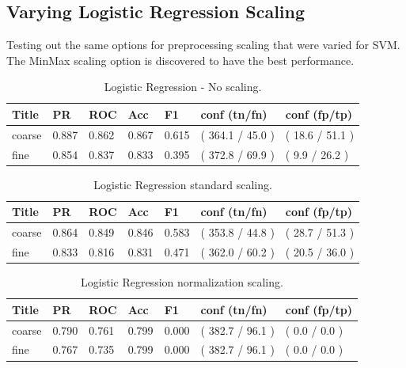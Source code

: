 \documentclass[ms]{nuthesis}
\begin{document}
\subsection{Varying Logistic Regression Scaling}
\label{sect:logitParam}
\par Testing out the same options for preprocessing scaling that were varied for SVM.
The MinMax scaling option is discovered to have the best performance.

\FloatBarrier
\begin{table}[H]
\centering
\caption{Logistic Regression - No scaling.}
\label{tab:LogRegDef}
\begin{tabular}{|l||l||l||l||l||l||l|}\toprule
Title & PR & ROC & Acc & F1 & conf (tn/fn) & conf (fp/tp) \\ \midrule
coarse & 0.887 & 0.862 & 0.867 & 0.615 & ( 364.1 / 45.0 ) & ( 18.6 / 51.1 ) \\
fine & 0.854 & 0.837 & 0.833 & 0.395 & ( 372.8 / 69.9 ) & ( 9.9 / 26.2 ) \\ \bottomrule
\end{tabular}
\end{table}
\FloatBarrier

\FloatBarrier
\begin{table}[H]
\centering
\caption{Logistic Regression standard scaling.}
\label{tab:LogRegStandard}
\begin{tabular}{|l||l||l||l||l||l||l|}\toprule
Title & PR & ROC & Acc & F1 & conf (tn/fn) & conf (fp/tp) \\ \midrule
coarse & 0.864 & 0.849 & 0.846 & 0.583 & ( 353.8 / 44.8 ) & ( 28.7 / 51.3 ) \\
fine & 0.833 & 0.816 & 0.831 & 0.471 & ( 362.0 / 60.2 ) & ( 20.5 / 36.0 ) \\ \bottomrule
\end{tabular}
\end{table}
\FloatBarrier

\FloatBarrier
\begin{table}[H]
\centering
\caption{Logistic Regression normalization scaling.}
\label{tab:LogRegNorm}
\begin{tabular}{|l||l||l||l||l||l||l|}\toprule
Title & PR & ROC & Acc & F1 & conf (tn/fn) & conf (fp/tp) \\ \midrule
coarse & 0.790 & 0.761 & 0.799 & 0.000 & ( 382.7 / 96.1 ) & ( 0.0 / 0.0 ) \\
fine & 0.767 & 0.735 & 0.799 & 0.000 & ( 382.7 / 96.1 ) & ( 0.0 / 0.0 ) \\ \bottomrule
\end{tabular}
\end{table}
\FloatBarrier
\end{document}
